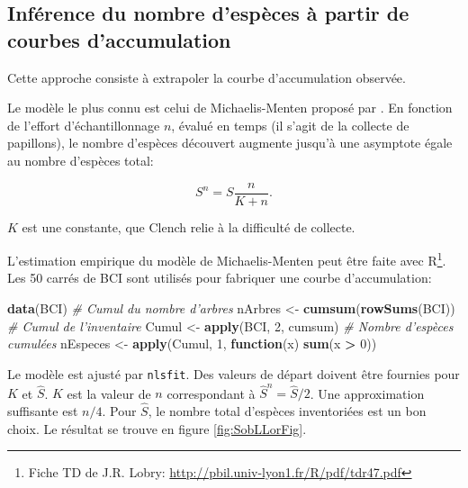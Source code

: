 \documentclass[
  11pt,
  french,
  a4paper,
  extrafontsizes,onecolumn,openright
  ]{memoir}
\newenvironment{Shaded}{\begin{snugshade}}{\end{snugshade}}
\newcommand{\CommentTok}[1]{\textcolor[rgb]{0.56,0.35,0.01}{\textit{#1}}}
\newcommand{\ControlFlowTok}[1]{\textcolor[rgb]{0.13,0.29,0.53}{\textbf{#1}}}
\newcommand{\DecValTok}[1]{\textcolor[rgb]{0.00,0.00,0.81}{#1}}
\newcommand{\KeywordTok}[1]{\textcolor[rgb]{0.13,0.29,0.53}{\textbf{#1}}}
\newcommand{\NormalTok}[1]{#1}
\newcommand{\OperatorTok}[1]{\textcolor[rgb]{0.81,0.36,0.00}{\textbf{#1}}}
\newcommand{\StringTok}[1]{\textcolor[rgb]{0.31,0.60,0.02}{#1}}
\begin{document}
\normalsize

\hypertarget{sec-RichesseSAC}{%
\subsection{Inférence du nombre d'espèces à partir de courbes d'accumulation}\label{sec-RichesseSAC}}

Cette approche consiste à extrapoler la courbe d'accumulation observée.

Le modèle le plus connu est celui de Michaelis-Menten \autocite{Michaelis1913} proposé par \textcite{Clench1979}.
En fonction de l'effort d'échantillonnage \(n\), évalué en temps (il s'agit de la collecte de papillons), le nombre d'espèces découvert augmente jusqu'à une asymptote égale au nombre d'espèces total:

\begin{equation} 
  S^{n} = S\frac{n}{K+n}.
\end{equation}

\(K\) est une constante, que Clench relie à la difficulté de collecte.

L'estimation empirique du modèle de Michaelis-Menten peut être faite avec R\footnote{Fiche TD de J.R. Lobry: \url{http://pbil.univ-lyon1.fr/R/pdf/tdr47.pdf}}.
Les 50 carrés de BCI sont utilisés pour fabriquer une courbe d'accumulation:

\scriptsize

\begin{Shaded}
\begin{Highlighting}[]
\KeywordTok{data}\NormalTok{(BCI)}
\CommentTok{# Cumul du nombre d'arbres}
\NormalTok{nArbres <-}\StringTok{ }\KeywordTok{cumsum}\NormalTok{(}\KeywordTok{rowSums}\NormalTok{(BCI))}
\CommentTok{# Cumul de l'inventaire}
\NormalTok{Cumul <-}\StringTok{ }\KeywordTok{apply}\NormalTok{(BCI, }\DecValTok{2}\NormalTok{, cumsum)}
\CommentTok{# Nombre d'espèces cumulées}
\NormalTok{nEspeces <-}\StringTok{ }\KeywordTok{apply}\NormalTok{(Cumul, }\DecValTok{1}\NormalTok{, }\ControlFlowTok{function}\NormalTok{(x) }\KeywordTok{sum}\NormalTok{(x }\OperatorTok{>}\StringTok{ }\DecValTok{0}\NormalTok{))}
\end{Highlighting}
\end{Shaded}

\normalsize

Le modèle est ajusté par \texttt{nlsfit}.
Des valeurs de départ doivent être fournies pour \(K\) et \(\hat{S}\).
\(K\) est la valeur de \(n\) correspondant à \(\hat{S}^{n} =\hat{S}/2\).
Une approximation suffisante est \(n/4\).
Pour \(\hat{S}\), le nombre total d'espèces inventoriées est un bon choix.
Le résultat se trouve en figure \ref{fig:SobLLorFig}.
\end{document}
